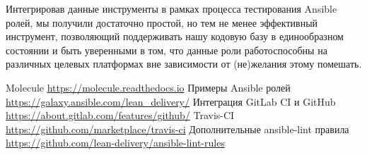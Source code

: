 \documentclass[10pt, a5paper]{article}
\begin{document}
Интегрировав данные инструменты в рамках процесса тестирования Ansible ролей, мы получили достаточно простой, но тем не менее эффективный инструмент, позволяющий поддерживать нашу кодовую базу в единообразном состоянии и быть уверенными в том, что данные роли работоспособны на различных целевых платформах вне зависимости от (не)желания этому помешать.

\begin{thebibliography}{20}
   Molecule \url{https://molecule.readthedocs.io}
   Примеры Ansible ролей \url{https://galaxy.ansible.com/lean_delivery/}
   Интеграция GitLab CI и GitHub \url{https://about.gitlab.com/features/github/}
   Travis-CI \url{https://github.com/marketplace/travis-ci}
   Дополнительные ansible-lint правила \url{https://github.com/lean-delivery/ansible-lint-rules}
\end{thebibliography}
\end{document}
